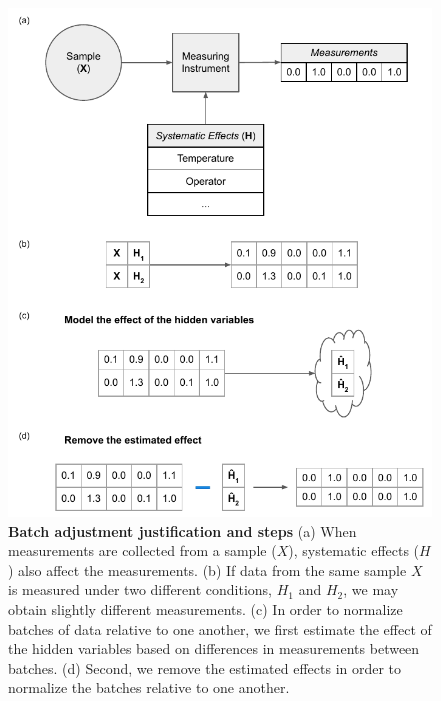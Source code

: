 \documentclass[notitlepage]{article}
\begin{document}
\begin{figure}
	\centering
	\includegraphics[width=\columnwidth]{figures/final/adjuster_workflow}
	\caption{\textbf{Batch adjustment justification and steps}
	(a) When measurements are collected from a sample ($X$), systematic effects ($H$) also affect the measurements.
	(b) If data from the same sample $X$ is measured under two different conditions, $H_1$ and $H_2$, we may obtain slightly different measurements.
	(c) In order to normalize batches of data relative to one another, we first estimate the effect of the hidden variables based on differences in measurements between batches.
	(d) Second, we remove the estimated effects in order to normalize the batches relative to one another.}
	\label{fig:workflow}
\end{figure}
\end{document}
